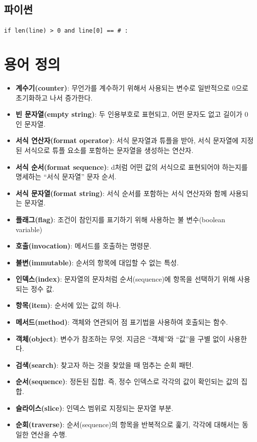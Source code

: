 \documentclass[
  letterpaper,
]{book}
\providecommand{\tightlist}{%
  \setlength{\itemsep}{0pt}\setlength{\parskip}{0pt}}\usepackage{longtable,booktabs,array}
\begin{document}
\subsection*{파이썬}\label{uxd30cuxc774uxc36c-28}

\texttt{if\ len(line)\ \textgreater{}\ 0\ and\ line{[}0{]}\ ==\ \textquotesingle{}\#\textquotesingle{}\ :}

\section{용어 정의}\label{r-string-terminology}

\begin{itemize}
\tightlist
\item
  \textbf{계수기(counter)}: 무언가를 계수하기 위해서 사용되는 변수로
  일반적으로 0으로 초기화하고 나서 증가한다. 
\item
  \textbf{빈 문자열(empty string)}: 두 인용부호로 표현되고, 어떤 문자도
  없고 길이가 0인 문자열. 
\item
  \textbf{서식 연산자(format operator)}: 서식 문자열과 튜플을 받아, 서식
  문자열에 지정된 서식으로 튜플 요소를 포함하는 문자열을 생성하는
  연산자.  
\item
  \textbf{서식 순서(format sequence)}: d처럼 어떤 값의 서식으로
  표현되어야 하는지를 명세하는 ``서식 문자열'' 문자 순서.
\item
  \textbf{서식 문자열(format string)}: 서식 순서를 포함하는 서식
  연산자와 함께 사용되는 문자열. 
\item
  \textbf{플래그(flag)}: 조건이 참인지를 표기하기 위해 사용하는 불
  변수(boolean variable) 
\item
  \textbf{호출(invocation)}: 메서드를 호출하는 명령문. 
\item
  \textbf{불변(immutable)}: 순서의 항목에 대입할 수 없는 특성.
\item
  \textbf{인덱스(index)}: 문자열의 문자처럼 순서(sequence)에 항목을
  선택하기 위해 사용되는 정수 값. 
\item
  \textbf{항목(item)}: 순서에 있는 값의 하나. 
\item
  \textbf{메서드(method)}: 객체와 연관되어 점 표기법을 사용하여 호출되는
  함수. 
\item
  \textbf{객체(object)}: 변수가 참조하는 무엇. 지금은 ``객체''와
  ``값''을 구별 없이 사용한다. 
\item
  \textbf{검색(search)}: 찾고자 하는 것을 찾았을 때 멈추는 순회 패턴.
\item
  \textbf{순서(sequence)}: 정돈된 집합. 즉, 정수 인덱스로 각각의 값이
  확인되는 값의 집합. 
\item
  \textbf{슬라이스(slice)}: 인덱스 범위로 지정되는 문자열 부분.
\item
  \textbf{순회(traverse)}: 순서(sequence)의 항목을 반복적으로 훑기,
  각각에 대해서는 동일한 연산을 수행. 
\end{itemize}
\end{document}
